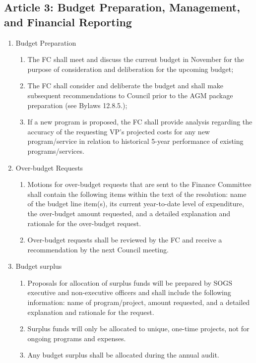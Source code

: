 \subsection{Article 3: Budget Preparation, Management, and Financial Reporting}
\begin{enumerate}[label*=\arabic*., align=left]	
\item Budget Preparation
\begin{enumerate}[label*=\arabic*., align=left]
	\item The FC shall meet and discuss the current budget in November for the purpose of consideration and deliberation for the upcoming budget;
	\item The FC shall consider and deliberate the budget and shall make subsequent recommendations to Council prior to the AGM package preparation (see Bylaws 12.8.5.);
	\item If a new program is proposed, the FC shall provide analysis regarding the accuracy of the requesting VP's projected costs for any new program/service in relation to historical 5-year performance of existing programs/services.
	\end{enumerate}
\item Over-budget Requests
\begin{enumerate}[label*=\arabic*., align=left]
	\item Motions for over-budget requests that are sent to the Finance Committee shall contain the following items within the text of the resolution: name of the budget line item(s), its current year-to-date level of expenditure, the over-budget amount requested, and a detailed explanation and rationale for the over-budget request.
	\item Over-budget requests shall be reviewed by the FC and receive a recommendation by the next Council meeting.
	\end{enumerate}
\item Budget surplus
\begin{enumerate}[label*=\arabic*., align=left]
	\item Proposals for allocation of surplus funds will be prepared by SOGS executive and non-executive officers and shall include the following information: name of program/project, amount requested, and a detailed explanation and rationale for the request.
	\item Surplus funds will only be allocated to unique, one-time projects, not for ongoing programs and expenses.
	\item Any budget surplus shall be allocated during the annual audit.

\end{enumerate}
\end{enumerate}
